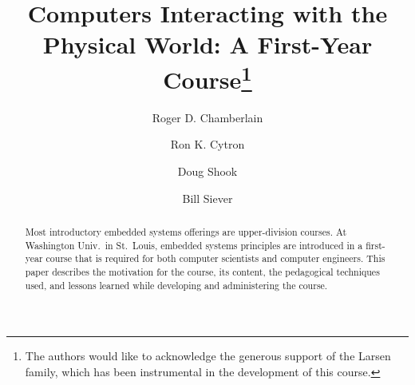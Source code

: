 \documentclass[runningheads]{llncs}
\begin{document}
%
\title{Computers Interacting with the Physical World:
A First-Year Course\thanks{The authors would like to acknowledge the
generous support of the Larsen family, which has been instrumental in the
development of this course.}
}

%
\author{Roger D. Chamberlain%
\and
Ron K. Cytron%
\and
Doug Shook%
\and
Bill Siever%
}
%
%
%

\maketitle              %
%
\begin{abstract}
Most introductory embedded systems offerings are upper-division courses.
At Washington Univ.~in St.~Louis,
embedded systems principles are introduced in a first-year course that
is required for both computer scientists and computer engineers.
This paper describes the motivation for the course, its content,
the pedagogical techniques used, and lessons learned while developing
and administering the course.

\end{abstract}
%
%
%










%
%
%


%
\end{document}
